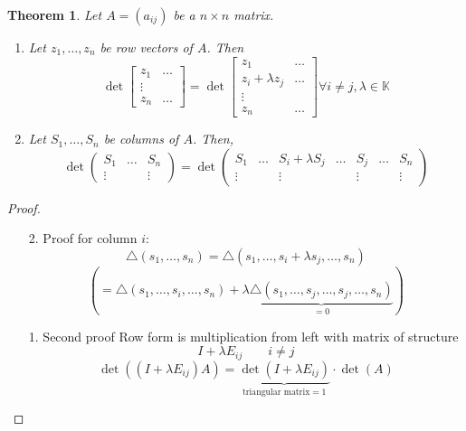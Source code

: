 \documentclass[a4paper]{article}
\newcounter{lecref}[section]
\numberwithin{lecref}{section}
\newtheorem{theorem}[lecref]{Theorem}
\begin{document}
\begin{theorem} %
  Let $A = (a_{ij})$ be a $n\times n$ matrix.
  \begin{enumerate}
    \item Let $z_1, \dots, z_n$ be row vectors of $A$. Then
      \[ \det\begin{bmatrix} z_1 & \ldots \\ \vdots & \\ z_n & \ldots \end{bmatrix} = \det\begin{bmatrix} z_1 & \ldots \\ z_i + \lambda z_j & \ldots \\ \vdots & \\ z_n & \ldots \end{bmatrix} \forall i \neq j, \lambda \in \mathbb K \]
    \item
      Let $S_1, \dots, S_n$ be columns of $A$. Then,
      \[ \det\begin{pmatrix} S_1 & \ldots & S_n \\ \vdots & & \vdots \end{pmatrix} = \det\begin{pmatrix} S_1 & \ldots & S_i + \lambda S_j & \ldots & S_j & \ldots & S_n \\ \vdots & & \vdots & & \vdots & & \vdots \end{pmatrix} \]
  \end{enumerate}
\end{theorem}
\begin{proof}
  \begin{enumerate}
    \item[2.] Proof for column $i$:
      \[ \triangle(s_1, \dots, s_n)= \triangle(s_1, \dots, s_i + \lambda s_j, \dots, s_n) \]
      \[ \left( = \triangle(s_1, \dots, s_i, \dots, s_n) + \lambda \underbrace{\triangle(s_1, \dots, s_j, \dots, s_j, \dots, s_n)}_{=0} \right) \]
    \item[1.] Second proof
      Row form is multiplication from left with matrix of structure
      \[ I + \lambda E_{ij} \qquad i \neq j \]
      \[ \det((I + \lambda E_{ij}) A) = \underbrace{\det(I + \lambda E_{ij})}_{\text{triangular matrix} = 1} \cdot \det(A) \]
  \end{enumerate}
\end{proof}
\end{document}
